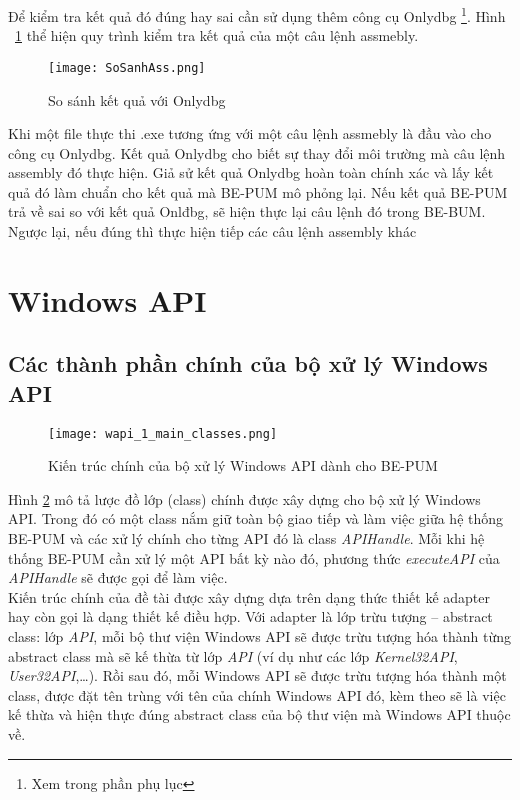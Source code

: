		Để kiểm tra kết quả đó đúng hay sai cần sử dụng thêm công cụ Onlydbg \footnote{Xem trong phần phụ lục}. Hình ~\ref{fig:SoSanhAss} thể hiện quy trình kiểm tra kết quả của một câu lệnh assmebly.
			\begin{center}
			\begin{figure}[htp]
				\begin{center}
					\texttt{[image: SoSanhAss.png]}
				\end{center}
				\caption{So sánh kết quả với Onlydbg}	
					\label{fig:SoSanhAss}		
			\end{figure}
		\end{center}			
		
		Khi một file thực thi .exe tương ứng với một câu lệnh assmebly là đầu vào cho công cụ Onlydbg. Kết quả Onlydbg cho biết sự thay đổi môi trường mà câu lệnh assembly đó thực hiện. Giả sử kết quả Onlydbg hoàn toàn chính xác và lấy kết quả đó làm chuẩn cho kết quả mà BE-PUM mô phỏng lại. Nếu kết quả BE-PUM trả về sai so với kết quả Onlđbg, sẽ hiện thực lại câu lệnh đó trong BE-BUM. Ngược lại, nếu đúng thì thực hiện tiếp các câu lệnh assembly khác
		
\newpage
\section{Windows API} \label{sec:wapi_design}

	\subsection{Các thành phần chính của bộ xử lý Windows API} \label{sec:main_classes}

	\begin{figure}[htp]
	\centering
		\texttt{[image: wapi\_1\_main\_classes.png]}
		\caption{Kiến trúc chính của bộ xử lý Windows API dành cho BE-PUM}	
		\label{fig:wapi_1_main_classes}		
	\end{figure}

Hình \ref{fig:wapi_1_main_classes} mô tả lược đồ lớp (class) chính được xây dựng cho bộ xử lý Windows API. Trong đó có một class nắm giữ toàn bộ giao tiếp và làm việc giữa hệ thống BE-PUM và các xử lý chính cho từng API đó là class \textit{APIHandle}. Mỗi khi hệ thống BE-PUM cần xử lý một API bất kỳ nào đó, phương thức \textit{executeAPI} của \textit{APIHandle} sẽ được gọi để làm việc.\\

Kiến trúc chính của đề tài được xây dựng dựa trên dạng thức thiết kế adapter hay còn gọi là dạng thiết kế điều hợp. Với adapter là lớp trừu tượng – abstract class: lớp \textit{API}, mỗi bộ thư viện Windows API sẽ được trừu tượng hóa thành từng abstract class mà sẽ kế thừa từ lớp \textit{API} (ví dụ như các lớp \textit{Kernel32API}, \textit{User32API},…). Rồi sau đó, mỗi Windows API sẽ được trừu tượng hóa thành một class, được đặt tên trùng với tên của chính Windows API đó, kèm theo sẽ là việc kế thừa và hiện thực đúng abstract class của bộ thư viện mà Windows API thuộc về.\\

